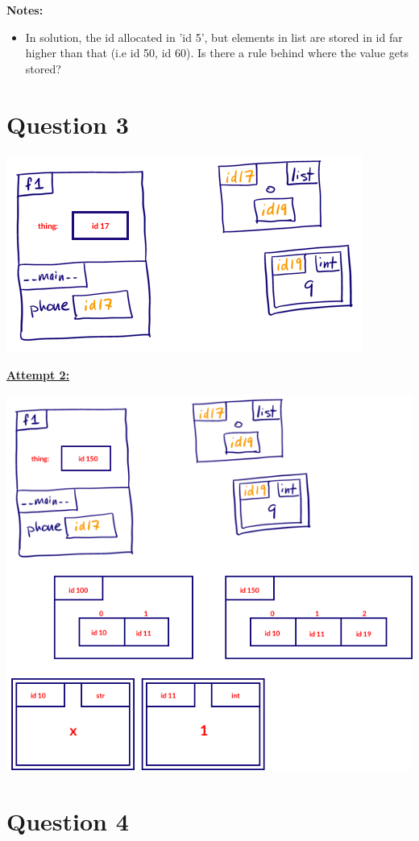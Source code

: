 \documentclass[12pt]{article}
\begin{document}
\bigskip

\textbf{Notes:}

\begin{itemize}
    \item In solution, the id allocated in 'id 5', but elements in list are stored
    in id far higher than that (i.e id 50, id 60). Is there a rule behind where
    the value gets stored?
\end{itemize}

\section*{Question 3}
\begin{center}
\includegraphics[width=0.5\linewidth]{images/worksheet_1_q3_solution.png}
\end{center}

\bigskip

\begin{mdframed}
    \underline{\textbf{Attempt 2:}}

    \bigskip

    \begin{center}
    \includegraphics[width=0.5\linewidth]{images/worksheet_1_q3_correction.png}
    \end{center}

\end{mdframed}

\section*{Question 4}
\end{document}

